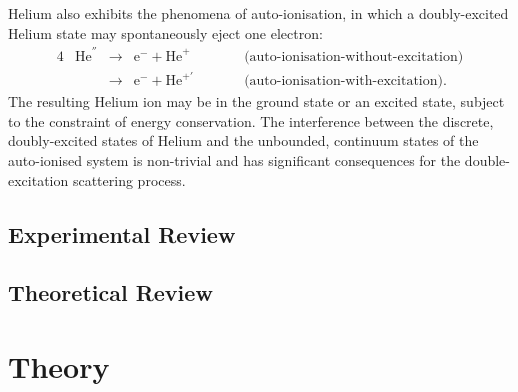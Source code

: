 \documentclass[]{article}
\begin{document}

Helium also exhibits the phenomena of auto-ionisation, in which a doubly-excited
Helium state may spontaneously eject one electron:
\begin{alignat*}{4}
  &
  \mathrm{He}^{''}
  &
  {}\to{}
  &
  \mathrm{e}^{-}
  +
  \mathrm{He}^{+}
  &
  \quad\quad
  &
  \text{(auto-ionisation-without-excitation)}
  \\
  &
  &
  {}\to{}
  &
  \mathrm{e}^{-}
  +
  \mathrm{He}^{+'}
  &
  \quad\quad
  &
  \text{(auto-ionisation-with-excitation)}
  .
\end{alignat*}
The resulting Helium ion may be in the ground state or an excited state,
subject to the constraint of energy conservation.
The interference between the discrete, doubly-excited states of Helium and the
unbounded, continuum states of the auto-ionised system is non-trivial and has
significant consequences for the double-excitation scattering process.


\subsection{Experimental Review}
\label{sec:in-exp}

\subsection{Theoretical Review}
\label{sec:in-th}







\section{Theory}
\label{sec:th}
\end{document}
